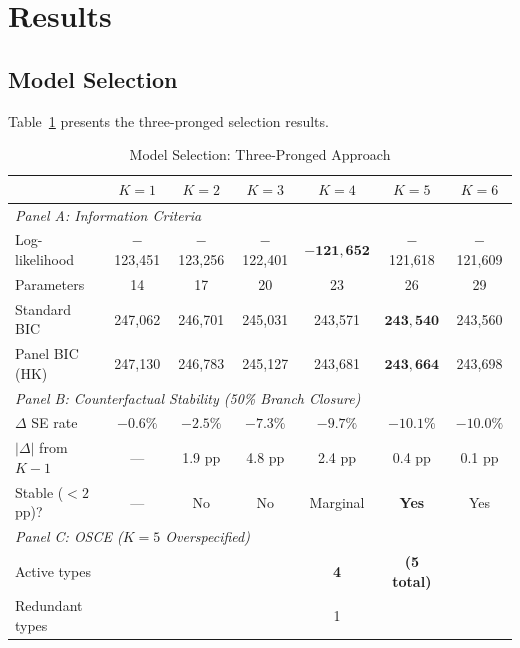\documentclass[12pt]{article}
\begin{document}
\section{Results}
\label{sec:results}

\subsection{Model Selection}

Table~\ref{tab:model_selection} presents the three-pronged selection results.

\begin{table}[H]
\centering
\caption{Model Selection: Three-Pronged Approach}
\label{tab:model_selection}
\begin{threeparttable}
\begin{tabular}{lcccccc}
\toprule
& $K=1$ & $K=2$ & $K=3$ & $K=4$ & $K=5$ & $K=6$ \\
\midrule
\multicolumn{7}{l}{\textit{Panel A: Information Criteria}} \\
Log-likelihood & $-$123,451 & $-$123,256 & $-$122,401 & $\mathbf{-121{,}652}$ & $-$121,618 & $-$121,609 \\
Parameters & 14 & 17 & 20 & 23 & 26 & 29 \\
Standard BIC & 247,062 & 246,701 & 245,031 & 243,571 & $\mathbf{243{,}540}$ & 243,560 \\
Panel BIC (HK) & 247,130 & 246,783 & 245,127 & 243,681 & $\mathbf{243{,}664}$ & 243,698 \\
[4pt]
\multicolumn{7}{l}{\textit{Panel B: Counterfactual Stability (50\% Branch Closure)}} \\
$\Delta$ SE rate & $-0.6\%$ & $-2.5\%$ & $-7.3\%$ & $-9.7\%$ & $-10.1\%$ & $-10.0\%$ \\
$|\Delta|$ from $K-1$ & --- & 1.9 pp & 4.8 pp & 2.4 pp & 0.4 pp & 0.1 pp \\
Stable ($<2$ pp)? & --- & No & No & Marginal & \textbf{Yes} & Yes \\
[4pt]
\multicolumn{7}{l}{\textit{Panel C: OSCE ($K=5$ Overspecified)}} \\
Active types & & & & \textbf{4} & \textbf{(5 total)} & \\
Redundant types & & & & 1 & & \\
\bottomrule
\end{tabular}
\begin{tablenotes}

\end{tablenotes}
\end{threeparttable}
\end{table}
\end{document}
